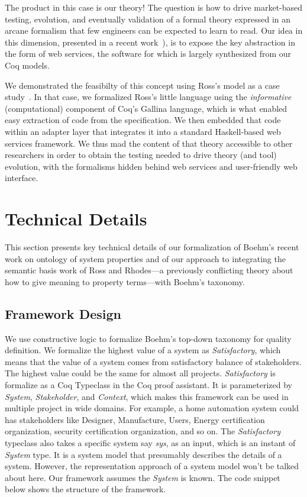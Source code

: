 \documentclass[conference]{IEEEtran}
\begin{document}
The product in this case is our theory! The question is how to drive market-based testing, evolution, and eventually validation of a formal theory expressed in an arcane formalism that few engineers can be expected to learn to read. Our idea in this dimension, presented in a recent work~\cite{Sullivan:evolutionary}), is to expose the key abstraction in the form of web services, the software for which is largely synthesized from our Coq models. 

We demonstrated the feasibilty of this concept using Ross's model as a case study~\cite{sullivan-cser15}. In that case, we formalized Ross's little language using the {\em informative} (computational) component of Coq's Gallina language, which is what enabled easy extraction of code from the specification. We then embedded that code within an adapter layer that integrates it into a standard Haskell-based web services framework. We thus mad the content of that theory accessible to other researchers in order to obtain the testing needed to drive theory (and tool) evolution, with the formalisms hidden behind web services and user-friendly web interface. 


\section{Technical Details}

This section presents key technical details of our formalization of Boehm's recent work on ontology of system properties and of our approach to integrating the semantic basis work of Ross and Rhodes---a previously conflicting theory about how to give meaning to property terms---with Boehm's taxonomy.

\subsection{Framework Design}
We use constructive logic to formalize Boehm's top-down taxonomy for quality definition. We formalize the highest value of a system as {\em Satisfactory}, which means that the value of a system comes from satisfactory balance of stakeholders. The highest value could be the same for almost all projects. {\em Satisfactory} is formalize as a Coq Typeclass in the Coq proof assistant. It is parameterized by {\em System}, {\em Stakeholder}, and {\em Context}, which makes this framework can be used in multiple project in wide domains. For example, a home automation system could has stakeholders like Designer, Manufacture, Users, Energy certification organization, security certification organization, and so on. The {\em Satisfactory} typeclass also takes a specific system say {\em sys}, as an input, which is an instant of {\em System} type. It is a system model that presumably describes the details of a system. However, the representation approach of a system model won't be talked about here. Our framework assumes the {\em System} is known. The code snippet below shows the structure of the framework. 
\end{document}
